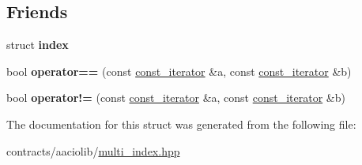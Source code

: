 \subsection*{Friends}
\begin{DoxyCompactItemize}
\item 
\mbox{\label{structaacio_1_1multi__index_1_1index_1_1const__iterator_a98d9477848d2c563b310010a4f7b8fed}} 
struct {\bfseries index}
\item 
\mbox{\label{structaacio_1_1multi__index_1_1index_1_1const__iterator_ab0ac7de651351823aece097eb3be1cfb}} 
bool {\bfseries operator==} (const \mbox{\hyperlink{structaacio_1_1multi__index_1_1index_1_1const__iterator}{const\+\_\+iterator}} \&a, const \mbox{\hyperlink{structaacio_1_1multi__index_1_1index_1_1const__iterator}{const\+\_\+iterator}} \&b)
\item 
\mbox{\label{structaacio_1_1multi__index_1_1index_1_1const__iterator_a5fbca5b71055f2b793ae1607239b13a0}} 
bool {\bfseries operator!=} (const \mbox{\hyperlink{structaacio_1_1multi__index_1_1index_1_1const__iterator}{const\+\_\+iterator}} \&a, const \mbox{\hyperlink{structaacio_1_1multi__index_1_1index_1_1const__iterator}{const\+\_\+iterator}} \&b)
\end{DoxyCompactItemize}


The documentation for this struct was generated from the following file\+:\begin{DoxyCompactItemize}
\item 
contracts/aaciolib/\mbox{\hyperlink{multi__index_8hpp}{multi\+\_\+index.\+hpp}}\end{DoxyCompactItemize}
